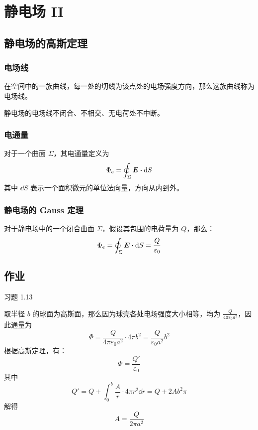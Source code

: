 \section{静电场 II}

\subsection{静电场的高斯定理}

\subsubsection{电场线}

在空间中的一族曲线，每一处的切线为该点处的电场强度方向，那么这族曲线称为电场线。

静电场的电场线不闭合、不相交、无电荷处不中断。

\subsubsection{电通量}

\begin{definition}[电通量]
	对于一个曲面 $\Sigma$，其电通量定义为
	$$
	\Phi_e = \oint_{\Sigma} \vect{E} \vdot \dd{S}
	$$
	其中 $\dd{S}$ 表示一个面积微元的单位法向量，方向从内到外。
\end{definition}

\subsubsection{静电场的 Gauss 定理}

\begin{theorem}
	对于静电场中的一个闭合曲面 $\Sigma$，假设其包围的电荷量为 $Q$，那么：
	$$
	\Phi_e = \oint_{\Sigma} \vect{E} \vdot \dd{S} = \frac{Q}{\varepsilon_0}
	$$
\end{theorem}

\subsection{作业}

\begin{problem}
	习题 1.13
	\begin{solution}
		取半径 $b$ 的球面为高斯面，那么因为球壳各处电场强度大小相等，均为 $\frac{Q}{4 \pi \varepsilon_0 a^2}$，因此通量为
		$$
		\Phi = \frac{Q}{4\pi \varepsilon_0 a^2} \cdot 4 \pi b^2 = \frac{Q}{ \varepsilon_0 a^2}{b^2}
		$$
		根据高斯定理，有：
		$$
		\Phi = \frac{Q'}{\varepsilon_0}
		$$
		其中
		$$
		Q' = Q + \int_{0}^{b} \frac{A}{r} \cdot 4\pi r^2 \dd{r} = Q + 2 A b^2 \pi
		$$
		解得
		$$
		A = \frac{Q}{2 \pi a^2}
		$$
	\end{solution}
\end{problem}

